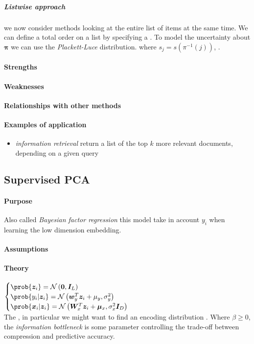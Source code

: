 \subparagraph{Listwise approach}
we now consider methods looking at the entire list of items at the same time. We can 
define a total order on a list by specifying a .
To model the uncertainty about $\bm{\pi}$ we can use the \emph{Plackett-Luce} 
distribution.  where
$s_{j}=s\left(\pi^{-1}(j)\right)$, .
\paragraph{Strengths}
\paragraph{Weaknesses}
\paragraph{Relationships with other methods}
\paragraph{Examples of application}
\begin{itemize}
    \item \emph{information retrieval} return a list of the top $k$ more relevant 
        documents, depending on a given query 
\end{itemize}

\subsection{Supervised PCA}
\paragraph{Purpose}
Also called \emph{Bayesian factor regression} this model take in account $y_{i}$ when
learning the low dimension embedding.
\paragraph{Assumptions}
\paragraph{Theory}
$\begin{cases}
    \prob{\bm{z}_{i}} = \mathcal{N}\left(\bm{0}, \bm{I}_{L}\right) \\
    \prob{y_{i}|\bm{z}_{i}} = \mathcal{N}\left(\bm{w}_{y}^{T}\bm{z}_{i}
    +\mu_{y},\sigma_{y}^{2}\right) \\
    \prob{\bm{x}_{i}|\bm{z}_{i}} = \mathcal{N}\left(\bm{W}_{x}^{T}\bm{z}_{i}
    +\bm{\mu}_{x},\sigma_{x}^{2}\bm{I}_{D}\right)
\end{cases}$\\
The , in particular we might want to find an encoding distribution
.
Where $\beta\geq 0$, the \emph{information bottleneck} is some parameter controlling 
the trade-off between compression and predictive accuracy.
